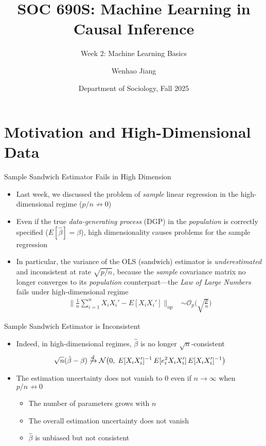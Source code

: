 \documentclass[aspectratio=1610,12pt,xcolor=dvipsnames]{beamer}
\title[CML]{SOC 690S: Machine Learning in Causal Inference\\[1.5pt]}
\subtitle{\large Week 2: Machine Learning Basics\\[-10pt]}
\author[Jiang] 
{\large Wenhao Jiang\vspace{-2em}}
\institute[Duke]{}
\date[Duke]
{\large Department of Sociology, Fall 2025}
\begin{document}

\begin{frame}
    \titlepage 
\end{frame}

\section{Motivation and High-Dimensional Data}

\begin{frame}
  \sectionpage
\end{frame}

\begin{frame}{Sample Sandwich Estimator Fails in High Dimension}

\begin{itemize}
    \item Last week, we discussed the problem of \textit{sample} linear regression in the high-dimensional regime ($p/n \not\to 0$)
    \item Even if the true \textit{data-generating process} (DGP) in the \textit{population} is correctly specified ($E[\hat \beta] = \beta$), high dimensionality causes problems for the sample regression 
    \item In particular, the variance of the OLS (sandwich) estimator is \textit{underestimated} and inconsistent at rate $\sqrt{p/n}$, because the \textit{sample} covariance matrix no longer converges to its \textit{population} counterpart—the \textit{Law of Large Numbers} fails under high-dimensional regime
    \begin{align*}
    \Big\|\tfrac{1}{n}\sum_{i=1}^n X_iX_i' - E[X_iX_i']\Big\|_{\mathrm{op}}
    &\sim \mathcal{O}_p\!\Big(\sqrt{\tfrac{p}{n}}\Big)
    \end{align*}
\end{itemize}
\end{frame}

\begin{frame}{Sample Sandwich Estimator is Inconsistent}

\begin{itemize}
    \item Indeed, in high-dimensional regimes, $\hat \beta$ is no longer $\sqrt{n}$-consistent
    \[
    \sqrt{n}(\hat{\beta}-\beta)\not\xrightarrow{d}
    \mathcal{N}\!\left(0,\;E[X_iX_i']^{-1}\,E[e_i^2 X_i X_i']\,E[X_iX_i']^{-1}\right)
    \]
    \item The estimation uncertainty does not vanish to 0 even if $n \rightarrow \infty$ when $p/n \not \to 0$
    \begin{itemize}
        \item The number of parameters grows with $n$
        \item The overall estimation uncertainty does not vanish
        \item $\hat\beta$ is unbiased but not consistent
    \end{itemize}
\end{itemize}

\end{frame}
\end{document}

